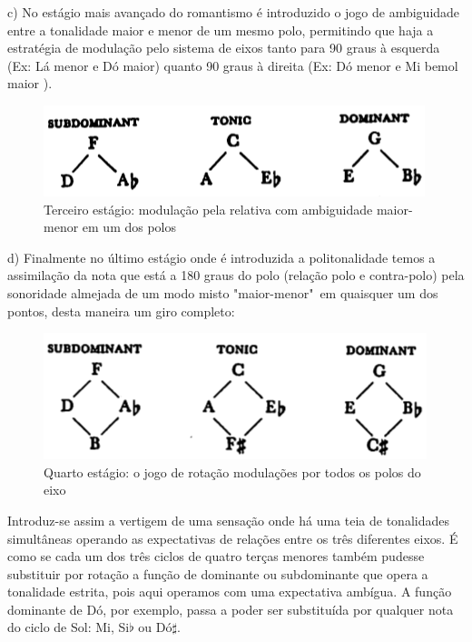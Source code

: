 \documentclass[
	12pt,				%
	openright,			%
	twoside,			%
	a4paper,			%
	english,			%
	french,				%
	spanish,			%
	brazil				%
	]{abntex2}
\begin{document}
c) No estágio mais avançado do romantismo é introduzido o jogo de ambiguidade entre a tonalidade maior e menor de um mesmo polo, permitindo que haja a estratégia de modulação pelo sistema de eixos tanto para 90 graus à esquerda (Ex: Lá menor e Dó maior) quanto 90 graus à direita (Ex: Dó menor e Mi bemol maior ).

\begin{figure}[!h]
	\caption{\label{fig_grafico}Terceiro estágio: modulação pela relativa com ambiguidade maior-menor em um dos polos }
	\begin{center}
	    \includegraphics[scale=0.5]{axis/estagio03.png}
	\end{center}
\end{figure}


d) Finalmente no último estágio onde é introduzida a politonalidade temos a assimilação da nota que está a 180 graus do polo (relação polo e contra-polo) pela sonoridade almejada de um modo misto "maior-menor"\ em quaisquer um dos pontos, desta maneira um giro completo:


\begin{figure}[!h]
	\caption{\label{fig_grafico}Quarto estágio: o jogo de rotação modulações por todos os polos do eixo }
	\begin{center}
	    \includegraphics[scale=0.5]{axis/estagio04.png}
	\end{center}
\end{figure}


Introduz-se assim a vertigem de uma sensação onde há uma teia de tonalidades simultâneas operando as expectativas de relações entre os três diferentes eixos. É como se cada um dos três ciclos de quatro terças menores também pudesse substituir por rotação a função de dominante ou subdominante que opera a tonalidade estrita, pois aqui operamos com uma expectativa ambígua. A função dominante de Dó, por exemplo, passa a poder ser substituída por qualquer nota do ciclo de Sol: Mi, Si$\flat$ ou Dó$\sharp$.
\end{document}
